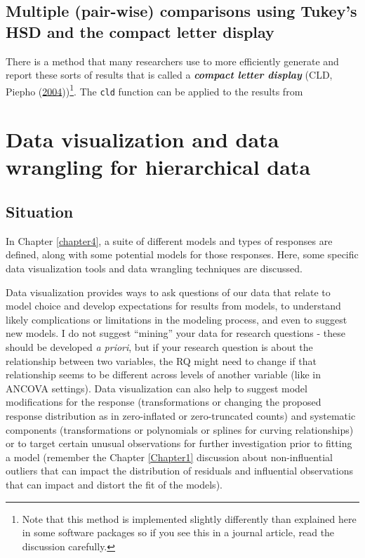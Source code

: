\documentclass[
]{book}
\begin{document}
\hypertarget{section4-3}{%
\section{Multiple (pair-wise) comparisons using Tukey's HSD and the compact letter display}\label{section4-3}}

\indent There is a method that many researchers use to more efficiently generate and
report these sorts of results that is called a \textbf{\emph{compact letter display}} 
(CLD, Piepho (\protect\hyperlink{ref-Piepho2004}{2004}))\footnote{Note that this method is implemented slightly differently than explained here in some software packages so if you see this in a journal article, read the discussion carefully.}. The \texttt{cld} function can be applied to the results from

\hypertarget{chapter5}{%
\chapter{Data visualization and data wrangling for hierarchical data}\label{chapter5}}

\hypertarget{section5-1}{%
\section{Situation}\label{section5-1}}

In Chapter \ref{chapter4}, a suite of different models and types of responses are defined, along with some potential models for those responses. Here, some specific data visualization tools and data wrangling techniques are discussed.

Data visualization provides ways to ask questions of our data that relate to model choice and develop expectations for results from models, to understand likely complications or limitations in the modeling process, and even to suggest new models. I do not suggest ``mining'' your data for research questions - these should be developed \emph{a priori}, but if your research question is about the relationship between two variables, the RQ might need to change if that relationship seems to be different across levels of another variable (like in ANCOVA settings). Data visualization can also help to suggest model modifications for the response (transformations or changing the proposed response distribution as in zero-inflated or zero-truncated counts) and systematic components (transformations or polynomials or splines for curving relationships) or to target certain unusual observations for further investigation prior to fitting a model (remember the Chapter \ref{Chapter1} discussion about non-influential outliers that can impact the distribution of residuals and influential observations that can impact and distort the fit of the models).
\end{document}
